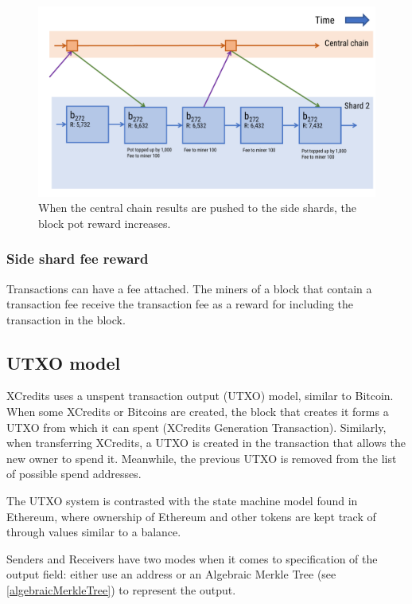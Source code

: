 \documentclass[a4paper,12pt]{article}
\begin{document}
\begin{figure}[!htb]
  \centering
  \includegraphics[page=1,width=.95\textwidth]{central-chain-pot-reward} 
  \caption{When the central chain results are pushed to the side shards, the block pot reward increases.}
  \label{fig:central-chain-pot-reward}
\end{figure}
\FloatBarrier

\subsubsection{Side shard fee reward}
Transactions can have a fee attached. The miners of a block that contain a transaction fee receive the transaction fee as a reward for including the transaction in the block.


\subsection{UTXO model}
XCredits uses a unspent transaction output (UTXO) model, similar to Bitcoin. When some XCredits or Bitcoins are created, the block that creates it forms a UTXO from which it can spent (XCredits Generation Transaction). Similarly, when transferring XCredits, a UTXO is created in the transaction that allows the new owner to spend it. Meanwhile, the previous UTXO is removed from the list of possible spend addresses.

The UTXO system is contrasted with the state machine model found in Ethereum, where ownership of Ethereum and other tokens are kept track of through values similar to a balance. 

Senders and Receivers have two modes when it comes to specification of the output field: either use an address or an Algebraic Merkle Tree (see \ref{algebraicMerkleTree}) to represent the output.
\end{document}
